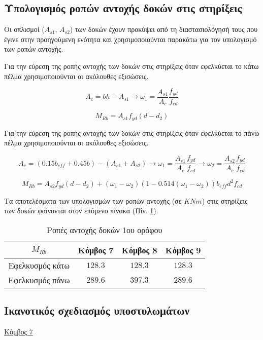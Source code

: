 \subsection{Υπολογισμός ροπών αντοχής δοκών στις στηρίξεις}
\noindent
Οι οπλισμοί ($A_{s1}$, $A_{s2}$) των δοκών έχουν προκύψει από τη διαστασιολόγησή τους που έγινε στην προηγούμενη ενότητα και χρησιμοποιούνται παρακάτω για τον υπολογισμό των ροπών αντοχής.

\noindent
Για την εύρεση της ροπής αντοχής των δοκών στις στηρίξεις όταν εφελκύεται το κάτω πέλμα χρησιμοποιούνται οι ακόλουθες εξισώσεις.

\[
A_c = bh - A_{s1} \rightarrow \omega_1 = \dfrac{A_{s1}}{A_c}\dfrac{f_{yd}}{f_{cd}}
\]

\[
M_{Rb} = A_{s1}f_{yd}(d-d_2)
\]

\noindent
Για την εύρεση της ροπής αντοχής των δοκών στις στηρίξεις όταν εφελκύεται το πάνω πέλμα χρησιμοποιούνται οι ακόλουθες εξισώσεις.

\[
A_c = (0.15b_{eff} + 0.45b ) - (A_{s1}+A_{s2}) \rightarrow \omega_1 = \dfrac{A_{s1}}{A_c}\dfrac{f_{yd}}{f_{cd}} \rightarrow \omega_2 = \dfrac{A_{s2}}{A_c}\dfrac{f_{yd}}{f_{cd}}
\]

\[
M_{Rb} = A_{s2}f_{yd}(d-d_2)+(\omega_1 - \omega_2)(1-0.514(\omega_1 - \omega_2))b_{eff}d^2f_{cd}
\]

\bigskip
\noindent
Τα αποτελέσματα των υπολογισμών των ροπών αντοχής (σε $KNm$) στις στηρίξεις των δοκών φαίνονται στον επόμενο πίνακα (Πίν. \ref{tab:mrdbeam}).

\begin{table}[h]
\centering\footnotesize
\begin{tabular}{| c || c | c | c |}
\hline
$M_{Rb}$ & Κόμβος 7 & Κόμβος 8 & Κόμβος 9 \\
\hline
\hline
Εφελκυσμός κάτω & $128.3$ & $128.3$ & $128.3$ \\
\hline
Εφελκυσμός πάνω & $289.6$ & $397.3$ & $289.6$ \\
\hline
\end{tabular}
\caption{Ροπές αντοχής δοκών 1ου ορόφου}
\label{tab:mrdbeam}
\end{table}

\bigskip

\subsection{Ικανοτικός σχεδιασμός υποστυλωμάτων}
\noindent
\underline{Κόμβος 7}

\bigskip

